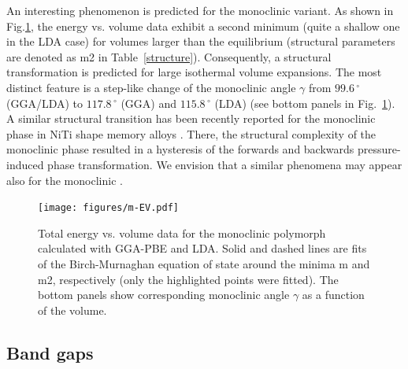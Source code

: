\documentclass[10pt,a4paper,twocolumn]{article}
\begin{document}
An interesting phenomenon is predicted for the monoclinic variant.
As shown in Fig.\ref{EV}, the energy vs. volume data exhibit a second minimum (quite a shallow one in the LDA case) for volumes larger than the equilibrium (structural parameters are denoted as m2 in Table~\ref{structure}).
Consequently, a structural transformation is predicted for large isothermal volume expansions.
The most distinct feature is a step-like change of the monoclinic angle $\gamma$ from $99.6\,^\circ$ (GGA/LDA) to $117.8\,^\circ$ (GGA) and $115.8\,^\circ$ (LDA) (see bottom panels in Fig.~\ref{EV}).
A similar structural transition has been recently reported for the monoclinic phase in NiTi shape memory alloys \cite{Holec2011-tg}.
There, the structural complexity of the monoclinic phase resulted in a hysteresis of the forwards and backwards pressure-induced phase transformation.
We envision that a similar phenomena may appear also for the monoclinic .

\begin{figure}
\begin{center}
	\texttt{[image: figures/m-EV.pdf]}
	\caption{Total energy vs. volume data for the monoclinic polymorph calculated with GGA-PBE and LDA. Solid and dashed lines are fits of the Birch-Murnaghan equation of state around the minima m and m2, respectively (only the highlighted points were fitted). The bottom panels show corresponding  monoclinic angle $\gamma$ as a function of the volume.}
   \label{EV}
\end{center}
\end{figure}

\subsection{Band gaps}
\end{document}
